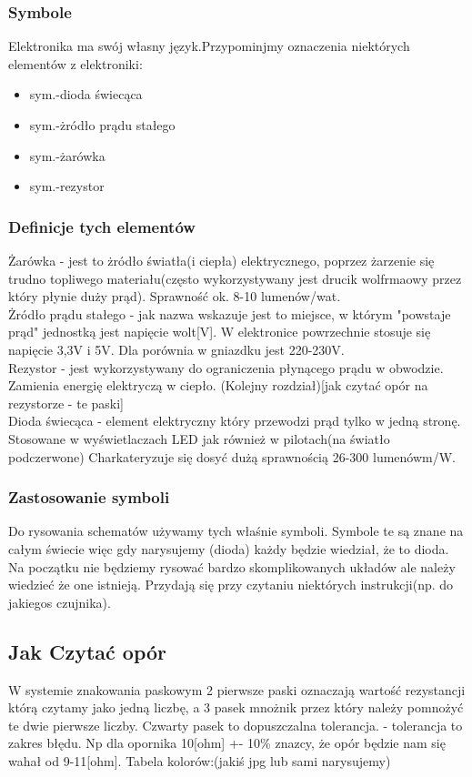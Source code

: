 	\subsubsection {Symbole}
	Elektronika ma swój własny język.Przypominjmy oznaczenia niektórych elementów z elektroniki:
\begin{itemize}
	\item sym.-dioda świecąca
	\item sym.-żródło prądu stałego
	\item sym.-żarówka
	\item sym.-rezystor
\end{itemize}
   \subsubsection{Definicje tych elementów}
Żarówka - jest to żródło światła(i ciepła) elektrycznego, poprzez żarzenie się trudno topliwego materiału(często wykorzystywany jest drucik wolfrmaowy przez który płynie duży prąd). Sprawność ok.
8-10 lumenów/wat. 
\\Żródło prądu stałego - jak nazwa wskazuje jest to miejsce, w którym "powstaje prąd" jednostką jest napięcie wolt[V]. W elektronice powrzechnie stosuje się napięcie 3,3V i 5V. Dla porównia w gniazdku jest 220-230V.
\\ Rezystor - jest wykorzystywany do ograniczenia płynącego prądu w obwodzie. Zamienia energię elektryczą w ciepło. (Kolejny rozdział)[jak czytać opór na rezystorze - te paski]
\\ Dioda świecąca - element elektryczny który przewodzi prąd tylko w jedną stronę. Stosowane w wyświetlaczach LED jak również w pilotach(na światło podczerwone) Charkateryzuje się dosyć dużą sprawnością 26-300 lumenówm/W. 

\subsubsection{Zastosowanie symboli}
    
Do rysowania schematów używamy tych właśnie symboli. Symbole te są znane na całym świecie więc gdy narysujemy (dioda) każdy będzie wiedział, że to dioda. Na początku nie będziemy rysować bardzo skomplikowanych układów ale należy wiedzieć że one istnieją. Przydają się przy czytaniu niektórych instrukcji(np. do jakiegos czujnika).

	\subsection{Jak Czytać opór}
	W systemie znakowania paskowym 2 pierwsze paski oznaczają wartość rezystancji którą czytamy jako jedną liczbę, a 3 pasek mnożnik przez który należy pomnożyć te dwie pierwsze liczby.
Czwarty pasek to dopuszczalna tolerancja. - tolerancja to zakres błędu. Np dla opornika 10[ohm] +- 10\% znazcy, że opór będzie nam się wahał od 9-11[ohm].
Tabela kolorów:(jakiś jpg lub sami narysujemy)

